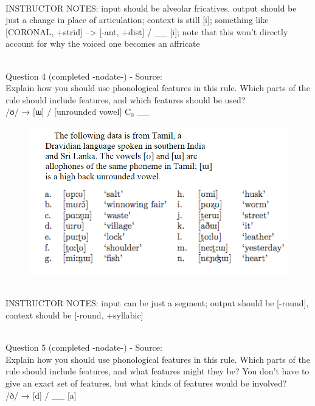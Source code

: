 \documentclass[12pt]{article}
\begin{document}
~\\
INSTRUCTOR NOTES: input should be alveolar fricatives, output should be just a change in place of articulation; context is still [i]; something like [CORONAL, +strid] --> [-ant, +dist] / \_\_ [i]; note that this won't directly account for why the voiced one becomes an affricate


~\\

{\large Question 4} (completed -nodate-) - Source: \\

Explain how you should use phonological features in this rule. Which parts of the rule should include features, and which features should be used?\\

/ʊ/ → {[ɯ]} / {[unrounded vowel]} C$_0$ \_\_

\begin{figure}[H]
\includegraphics{../images/tamil.png}
\end{figure}

~\\
INSTRUCTOR NOTES: input can be just a segment; output should be [-round], context should be [-round, +syllabic]


~\\

{\large Question 5} (completed -nodate-) - Source: \\

Explain how you should use phonological features in this rule. Which parts of the rule should include features, and what features might they be? You don't have to give an exact set of features, but what kinds of features would be involved?\\

/ð/ → {[d]} / \_\_ {[a]}
\end{document}
